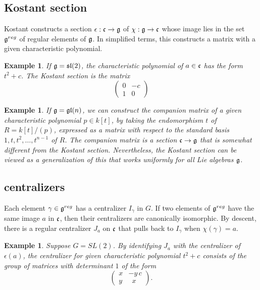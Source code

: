 \documentclass[brochure,english,12pt]{bourbaki}
\newtheorem{example}[equation]{Example}
\def\gl{\frak{gl}}
\def\sl{\frak{sl}}
\def\g{\frak{g}}
\def\cc{\frak{c}}
\begin{document}
\subsection{Kostant section}

Kostant constructs a section $\epsilon:\cc\to\g$ of $\chi:\g\to\cc$ whose image lies in the set $\g^{reg}$ 
of regular elements
of $\g$.  In simplified terms, this constructs a matrix with a given characteristic polynomial.


\begin{example}
If $\g=\sl(2)$, the characteristic polynomial of $a\in\cc$ has the form $t^2  +c$.
The Kostant section is the matrix
\[
\begin{pmatrix} 0 & -c\\ 1 & 0\end{pmatrix}
\]
\end{example}


\begin{example}
  If $\g=\gl(n)$, we can construct the companion matrix of a given
  characteristic polynomial $p\in k[t]$, by taking the endomorphism $t$ of
  $R=k[t]/(p)$, expressed as a matrix with respect to the standard
  basis $1,t,t^2,\ldots,t^{n-1}$ of $R$.  The companion matrix is a
  section $\cc\to\g$ that is somewhat different from the Kostant
  section.  Nevertheless, the Kostant section can be viewed as a
  generalization of this that works uniformly for all Lie algebras
  $\g$.
\end{example}


\subsection{centralizers}

Each element $\gamma\in\g^{reg}$ has a centralizer $I_\gamma$ in $G$.  If two
elements of $\g^{reg}$ have the same image $a$ in $\cc$, then their
centralizers are canonically isomorphic.  By descent, there is a
regular centralizer $J_a$ on $\cc$ that pulls back to $I_\gamma$ when $\chi(\gamma)=a$.



\begin{example}  Suppose $G=SL(2)$.  By identifying $J_a$ with the centralizer of
  $\epsilon(a)$, the centralizer for given characteristic polynomial $t^2+c$ consists of
  the group of matrices with determinant $1$ of the form
\[
\begin{pmatrix} x & -y\, c\\ y & \phantom{y}x
\end{pmatrix}.
\]
\end{example}
\end{document}
